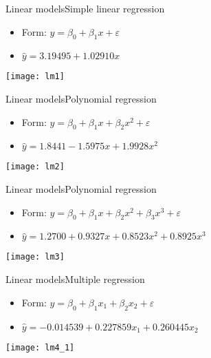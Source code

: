 \documentclass[xcolor=dvipsnames]{beamer}
\begin{document}
\begin{frame}{Linear models}{Simple linear regression}
	\begin{itemize}
		\item Form: $y = \beta_0 + \beta_1 x + \varepsilon$
		\item $\hat{y} = 3.19495 + 1.02910 x $
	\end{itemize}
\begin{center}
	\texttt{[image: lm1]}
\end{center}
\end{frame}

\begin{frame}{Linear models}{Polynomial regression}
	\begin{itemize}
		\item Form: $y = \beta_0 + \beta_1 x + \beta_2 x^2 + \varepsilon$
		\item $\hat{y} = 1.8441 - 1.5975 x + 1.9928x^2 $
	\end{itemize}
	\begin{center}
		\texttt{[image: lm2]}
	\end{center}
\end{frame}

\begin{frame}{Linear models}{Polynomial regression}
	\begin{itemize}
		\item Form: $y = \beta_0 + \beta_1 x + \beta_2 x^2 + \beta_3 x^3 + \varepsilon$
		\item $\hat{y} = 1.2700 +0.9327 x + 0.8523 x^2 + 0.8925 x^3$
	\end{itemize}
	\begin{center}
		\texttt{[image: lm3]}
	\end{center}
\end{frame}

\begin{frame}{Linear models}{Multiple regression}
	\begin{itemize}
		\item Form: $y = \beta_0 + \beta_1 x_1 + \beta_2 x_2 + \varepsilon$
		\item $\hat{y} = -0.014539 +0.227859 x_1 + 0.260445  x_2 $
	\end{itemize}
	\vspace{-1.5mm}
	\begin{center}
		\texttt{[image: lm4\_1]}
	\end{center}
\end{frame}
\end{document}
